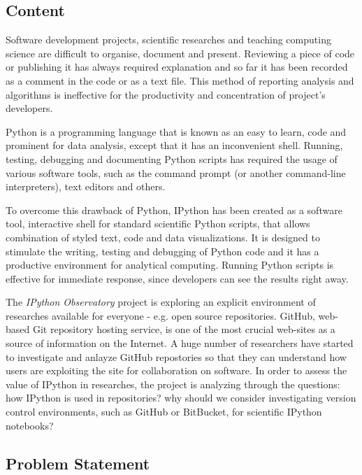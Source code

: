 \subsection{Content}

Software development projects, scientific researches and teaching computing science are difficult to organise, document and present. Reviewing a piece of code or publishing it has always required explanation and so far it has been recorded as a comment in the code or as a text file. This method of reporting analysis and algorithms is ineffective for the productivity and concentration of project's developers. 

Python is a programming language that is known as an easy to learn, code and prominent for data analysis, except that it has an inconvenient shell. Running, testing, debugging and documenting Python scripts has required the usage of various software tools, such as the command prompt (or another command-line interpreters), text editors and others. 

To overcome this drawback of Python, IPython has been created as a software tool, interactive shell for standard scientific Python scripts, that allows combination of styled text, code and data visualizations. It is designed to stimulate the writing, testing and debugging of Python code and it has a productive environment for analytical computing. \cite{mckinney2012python} Running Python scripts is effective for immediate response, since developers can see the results right away.

The \textit{IPython Observatory} project is exploring an explicit environment of researches available for everyone - e.g. open source repositories. GitHub,  web-based Git repository hosting service, is one of the most crucial web-sites as a source of information  on the Internet.\cite{gitHubWiki} A huge number of researchers have started to investigate and anlayze GitHub repostories so that they can understand how users are exploiting the site for collaboration on software. \cite{kalliamvakou2007promises} In order to assess the value of IPython in researches, the project is analyzing through the questions: how IPython is used in repositories? why should we consider investigating version control environments, such as GitHub or BitBucket, for scientific IPython notebooks? 

\subsection{Problem Statement}
\label{subsec:problem}

